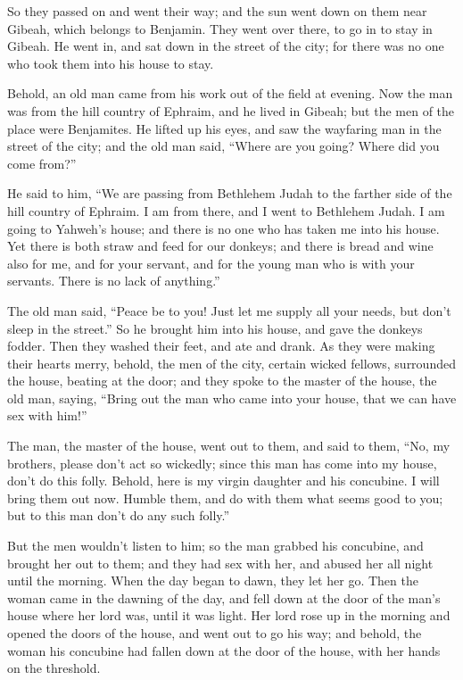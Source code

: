 {So they passed on and went their way; and the sun went down on them near Gibeah, which belongs to Benjamin.
They went over there, to go in to stay in Gibeah. He went in, and sat down in the street of the city; for there was no one who took them into his house to stay.
\par }{\PP {}Behold, an old man came from his work out of the field at evening. Now the man was from the hill country of Ephraim, and he lived in Gibeah; but the men of the place were Benjamites.
He lifted up his eyes, and saw the wayfaring man in the street of the city; and the old man said, “Where are you going? Where did you come from?”
\par }{\PP {}He said to him, “We are passing from Bethlehem Judah to the farther side of the hill country of Ephraim. I am from there, and I went to Bethlehem Judah. I am going to Yahweh’s house; and there is no one who has taken me into his house.
Yet there is both straw and feed for our donkeys; and there is bread and wine also for me, and for your servant, and for the young man who is with your servants. There is no lack of anything.”
\par }{\PP {}The old man said, “Peace be to you! Just let me supply all your needs, but don’t sleep in the street.”
So he brought him into his house, and gave the donkeys fodder. Then they washed their feet, and ate and drank.
As they were making their hearts merry, behold, the men of the city, certain wicked fellows, surrounded the house, beating at the door; and they spoke to the master of the house, the old man, saying, “Bring out the man who came into your house, that we can have sex with him!”
\par }{\PP {}The man, the master of the house, went out to them, and said to them, “No, my brothers, please don’t act so wickedly; since this man has come into my house, don’t do this folly.
Behold, here is my virgin daughter and his concubine. I will bring them out now. Humble them, and do with them what seems good to you; but to this man don’t do any such folly.”
\par }{\PP {}But the men wouldn’t listen to him; so the man grabbed his concubine, and brought her out to them; and they had sex with her, and abused her all night until the morning. When the day began to dawn, they let her go.
Then the woman came in the dawning of the day, and fell down at the door of the man’s house where her lord was, until it was light.
Her lord rose up in the morning and opened the doors of the house, and went out to go his way; and behold, the woman his concubine had fallen down at the door of the house, with her hands on the threshold.
}
